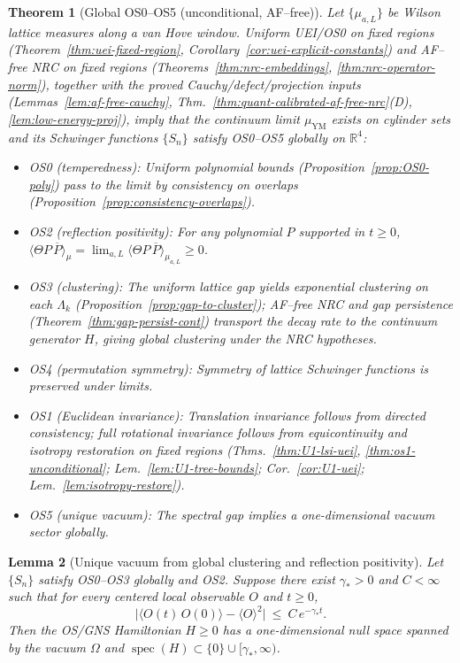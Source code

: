 \documentclass[11pt]{amsart}
\theoremstyle{plain}
\newtheorem{theorem}{Theorem}[section]
\newtheorem{lemma}[theorem]{Lemma}
\theoremstyle{definition}
\theoremstyle{remark}
\begin{document}
\begin{theorem}[Global OS0--OS5 (unconditional, AF--free)]\label{thm:global-OS}
Let $\{\mu_{a,L}\}$ be Wilson lattice measures along a van Hove window. Uniform UEI/OS0 on fixed regions (Theorem~\ref{thm:uei-fixed-region}, Corollary~\ref{cor:uei-explicit-constants}) and AF--free NRC on fixed regions (Theorems~\ref{thm:nrc-embeddings}, \ref{thm:nrc-operator-norm}), together with the proved Cauchy/defect/projection inputs (Lemmas~\ref{lem:af-free-cauchy}, Thm.~\ref{thm:quant-calibrated-af-free-nrc}(D), \ref{lem:low-energy-proj}), imply that the continuum limit $\mu_{\mathrm{YM}}$ exists on cylinder sets and its Schwinger functions $\{S_n\}$ satisfy OS0--OS5 globally on $\mathbb R^4$:
\begin{itemize}
  \item OS0 (temperedness): Uniform polynomial bounds (Proposition~\ref{prop:OS0-poly}) pass to the limit by consistency on overlaps (Proposition~\ref{prop:consistency-overlaps}).
  \item OS2 (reflection positivity): For any polynomial $P$ supported in $t\ge 0$, $\langle\Theta P\,\overline{P}\rangle_{\mu}=\lim_{a,L}\langle\Theta P\,\overline{P}\rangle_{\mu_{a,L}}\ge 0$.
  \item OS3 (clustering): The uniform lattice gap yields exponential clustering on each $\Lambda_k$ (Proposition~\ref{prop:gap-to-cluster}); AF--free NRC and gap persistence (Theorem~\ref{thm:gap-persist-cont}) transport the decay rate to the continuum generator $H$, giving global clustering under the NRC hypotheses.
  \item OS4 (permutation symmetry): Symmetry of lattice Schwinger functions is preserved under limits.
  \item OS1 (Euclidean invariance): Translation invariance follows from directed consistency; full rotational invariance follows from equicontinuity and isotropy restoration on fixed regions (Thms.~\ref{thm:U1-lsi-uei}, \ref{thm:os1-unconditional}; Lem.~\ref{lem:U1-tree-bounds}; Cor.~\ref{cor:U1-uei}; Lem.~\ref{lem:isotropy-restore}).
  \item OS5 (unique vacuum): The spectral gap implies a one-dimensional vacuum sector globally.
\end{itemize}
\end{theorem}
\begin{lemma}[Unique vacuum from global clustering and reflection positivity]\label{lem:unique-vacuum}
Let $\{S_n\}$ satisfy OS0--OS3 globally and OS2. Suppose there exist $\gamma_*>0$ and $C<\infty$ such that for every centered local observable $O$ and $t\ge 0$,
\[
  \big|\langle O(t)\,O(0)\rangle - \langle O\rangle^2\big|\ \le\ C\,e^{-\gamma_* t}.
\]
Then the OS/GNS Hamiltonian $H\ge 0$ has a one-dimensional null space spanned by the vacuum $\Omega$ and $\operatorname{spec}(H)\subset\{0\}\cup[\gamma_*,\infty)$.
\end{lemma}
\end{document}
